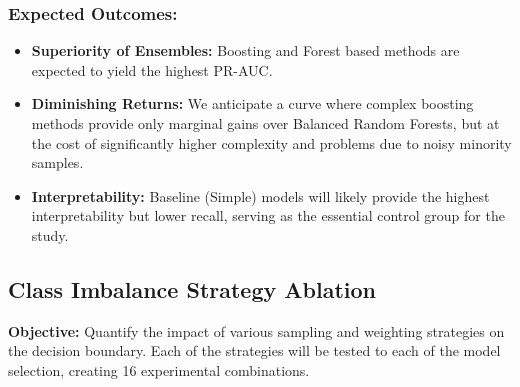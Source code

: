 \documentclass{article}
\begin{document}
\subsubsection*{Expected Outcomes:}
 
\begin{itemize}
    \item \textbf{Superiority of Ensembles:} Boosting and Forest based methods are expected to yield the highest PR-AUC.
    \item \textbf{Diminishing Returns:} We anticipate a curve where complex boosting methods provide only marginal gains over Balanced Random Forests, but at the cost of significantly higher complexity and problems due to noisy minority samples.
    \item \textbf{Interpretability:} Baseline (Simple) models will likely provide the highest interpretability but lower recall, serving as the essential control group for the study.
\end{itemize}
 
\subsection*{Class Imbalance Strategy Ablation}
 
\textbf{Objective:} Quantify the impact of various sampling and weighting strategies on the decision boundary. Each of the strategies will be tested to each of the model selection, creating 16 experimental combinations.
 
\end{document}
